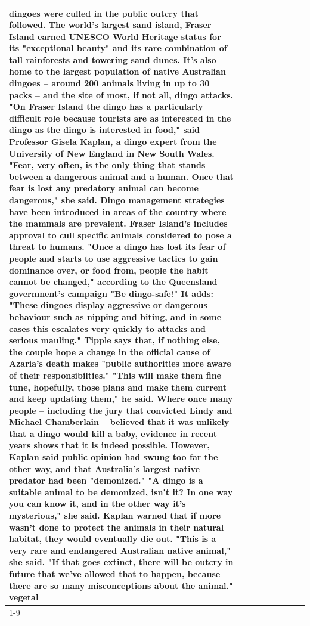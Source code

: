 \begin{table}[H]
\begin{tabular}{lllrlllll}
dingoes were culled in the public outcry that followed. The world's largest sand island, Fraser Island earned UNESCO World Heritage status for its "exceptional beauty" and its rare combination of tall rainforests and towering sand dunes. It's also home to the largest population of native Australian dingoes -- around 200 animals living in up to 30 packs -- and the site of most, if not all, dingo attacks. "On Fraser Island the dingo has a particularly difficult role because tourists are as interested in the dingo as the dingo is interested in food," said Professor Gisela Kaplan, a dingo expert from the University of New England in New South Wales. "Fear, very often, is the only thing that stands between a dangerous animal and a human. Once that fear is lost any predatory animal can become dangerous," she said. Dingo management strategies have been introduced in areas of the country where the mammals are prevalent. Fraser Island's includes approval to cull specific animals considered to pose a threat to humans. "Once a dingo has lost its fear of people and starts to use aggressive tactics to gain dominance over, or food from, people the habit cannot be changed," according to the Queensland government's campaign "Be dingo-safe!" It adds: "These dingoes display aggressive or dangerous behaviour such as nipping and biting, and in some cases this escalates very quickly to attacks and serious mauling." Tipple says that, if nothing else, the couple hope a change in the official cause of Azaria's death makes "public authorities more aware of their responsibilties." "This will make them fine tune, hopefully, those plans and make them current and keep updating them," he said. Where once many people -- including the jury that convicted Lindy and Michael Chamberlain -- believed that it was unlikely that a dingo would kill a baby, evidence in recent years shows that it is indeed possible. However, Kaplan said public opinion had swung too far the other way, and that Australia's largest native predator had been "demonized." "A dingo is a suitable animal to be demonized, isn't it? In one way you can know it, and in the other way it's mysterious," she said. Kaplan warned that if more wasn't done to protect the animals in their natural habitat, they would eventually die out. "This is a very rare and endangered Australian native animal," she said. "If that goes extinct, there will be outcry in future that we've allowed that to happen, because there are so many misconceptions about the animal." vegetal \\
\cline{1-9}

\end{tabular}
\end{table}
